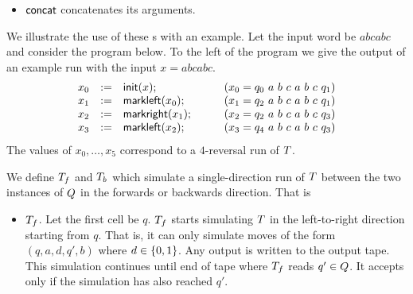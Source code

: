 {\begin{itemize}
	\item
	$\mathsf{concat}$ concatenates its arguments.
\end{itemize}
%
We illustrate the use of these \FT{}s with an example.  Let the input word be
$a b c a b c$
and consider the program below.
%
To the left of the program we give the output of an example run with the input
$x = a b c a b c$.
\[
\begin{array}{rcll}
x_0 &:=& \mathsf{init}(x);
& \qquad (x_0 = q_0\ a\ b\ c\ a\ b\ c\ q_1) \\
x_1 &:=& \mathsf{markleft}(x_0);
& \qquad (x_1 = q_2\ a\ b\ c\ a\ b\ c\ q_1) \\
x_2 &:=& \mathsf{markright}(x_1);
& \qquad (x_2 = q_2\ a\ b\ c\ a\ b\ c\ q_3) \\
x_3 &:=& \mathsf{markleft}(x_2);
& \qquad (x_3 = q_4\ a\ b\ c\ a\ b\ c\ q_3) \\
\end{array}
\]
The values of
$x_0, \ldots, x_5$
correspond to a $4$-reversal run of $T$.

We define $T_f$ and $T_b$ which simulate a
single-direction run of $T$ between the two instances of $Q$
in the forwards or backwards direction.
%
That is
\begin{itemize}
	\item
	$T_f$.  %
	Let the first cell be $q$.
	$T_f$ starts simulating $T$ in the left-to-right direction
	starting from $q$.
	That is, it can only simulate moves of the form
	$(q, a, d, q', b)$
	where
	$d \in \{0, 1\}$.
	Any output is written to the output tape.
	This simulation continues until end of tape where $T_f$ reads  
	$q' \in Q$.
	It accepts only if the simulation has also reached $q'$.
	

\end{itemize}}
